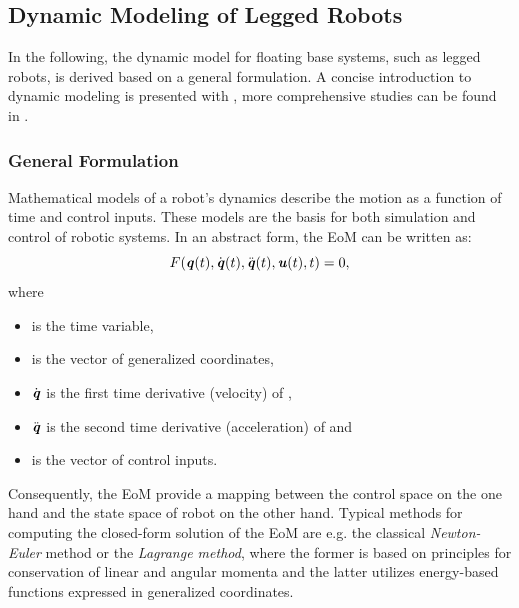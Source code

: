 \subsection{Dynamic Modeling of Legged Robots}\label{subsec:DynamicModeling}
In the following, the dynamic model for floating base systems, such as legged robots, is derived based on a general formulation. A concise introduction to dynamic modeling is presented with \cite{scaronTeaching}, more comprehensive studies can be found in \cite{roboticSystemsLab2017, featherstone2014rigid}.
\subsubsection{General Formulation}
Mathematical models of a robot's dynamics describe the motion as a function of time and control inputs. These models are the basis for both simulation and control of robotic systems. In an abstract form, the \gls{EoM} can be written as: 
\begin{equation} \label{eqn:EoMGeneral}
F(\bm{\mathit{q}}(t),\dot{\bm{\mathit{q}}}(t),\ddot{\bm{\mathit{q}}}(t),\bm{\mathit{u}}(t),t)=0,
\end{equation}
where 
\begin{itemize}
\item {} is the time variable, 
\item {} is the vector of generalized coordinates,
\item $\dot{\bm{\mathit{q}}}$ is the first time derivative (velocity) of , 
\item $\ddot{\bm{\mathit{q}}}$ is the second time derivative (acceleration) of  and
\item {} is the vector of control inputs. 
\end{itemize}
Consequently, the \gls{EoM} provide a mapping between the control space on the one hand and the state space of robot on the other hand. Typical methods for computing the closed-form solution of the \gls{EoM} are e.g. the classical \textit{Newton-Euler} method or the \textit{Lagrange method}, where the former is based on principles for conservation of linear and angular momenta and the latter utilizes energy-based functions expressed in generalized coordinates. 
